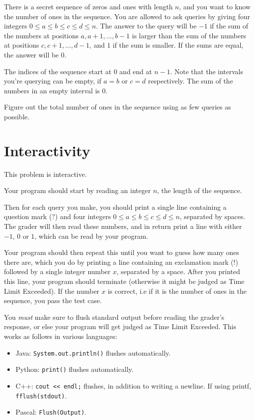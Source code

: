 There is a secret sequence of zeros and ones with length $n$, and you want to know the number of ones in the sequence.
You are allowed to ask queries by giving four integers $0 \leq a \leq b \leq c \leq d \leq n$. The answer
to the query will be $-1$ if the sum of the numbers at positions $a, a+1, ..., b-1$ is larger than the
sum of the numbers at positions $c, c+1, ..., d-1$, and $1$ if the sum is smaller. If the sums are equal,
the answer will be $0$.

The indices of the sequence start at $0$ and end at $n-1$. Note that the intervals you're querying can be empty,
if $a = b$ or $c = d$ respectively. The sum of the numbers in an empty interval is $0$.

Figure out the total number of ones in the sequence using as few queries as possible.

\section*{Interactivity}
This problem is interactive.

Your program should start by reading an integer $n$, the length of the sequence.

Then for each query you make, you should print a single line containing a question mark (?) and
four integers $0 \leq a \leq b \leq c \leq d \leq n$, separated by spaces.
The grader will then read these numbers, and in return print a line with either $-1$, $0$ or $1$, which can be read by your program.

Your program should then repeat this until you want to guess how many ones there are,
which you do by printing a line containing an exclamation mark (!) followed by a single integer number $x$, separated by a space.
After you printed this line, your program should terminate (otherwise it might be judged as Time Limit Exceeded).
If the number $x$ is correct, i.e if it is the number of ones in the sequence, you pass the test case.

You \emph{must} make sure to flush standard output before reading the grader's response, or else your program
will get judged as Time Limit Exceeded. This works as follows in various languages:
\begin{itemize}
  \item Java: \texttt{System.out.println()} flushes automatically.
  \item Python: \texttt{print()} flushes automatically.
  \item C++: \texttt{cout << endl;} flushes, in addition to writing a newline. If using printf, \texttt{fflush(stdout)}.
  \item Pascal: \texttt{Flush(Output)}.
\end{itemize}


